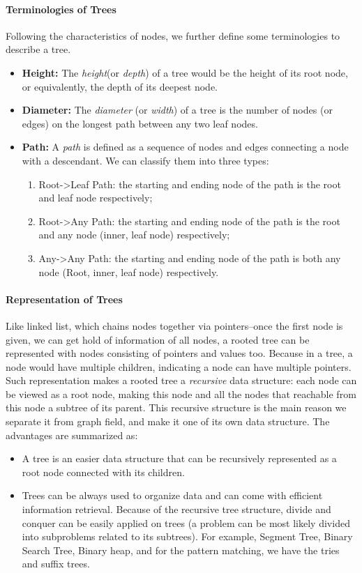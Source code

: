 \documentclass[../main.tex]{subfiles}
\begin{document}
\paragraph{Terminologies of Trees} Following the characteristics of nodes, we further define some terminologies to describe a tree. 
\begin{itemize}
    \item \textbf{Height:} The \textit{height}(or \textit{depth}) of a tree would be the height of its root node, or equivalently, the depth of its deepest node. 
    \item \textbf{Diameter:} The \textit{diameter} (or \textit{width}) of a tree is the number of nodes (or edges) on the longest path between any two leaf nodes. 
    \item \textbf{Path:} A \textit{path} is defined as a sequence of nodes and edges connecting a node with a descendant.  We can classify them into three types: 
\begin{enumerate}
    \item Root->Leaf Path: the starting and ending node of the path is the root and leaf node respectively;
    \item Root->Any Path: the starting and ending node of the path is the root and any node (inner, leaf node) respectively;
    \item Any->Any Path: the starting and ending node of the path is both any node (Root, inner, leaf node) respectively. 
\end{enumerate}
\end{itemize}

\paragraph{Representation of Trees}   Like linked list, which chains nodes together via pointers--once the first node is given, we can get hold of information of all nodes, a rooted tree can be represented with nodes consisting of pointers and values too. Because in a tree, a node would have multiple children, indicating a node can have multiple pointers.  Such representation makes a rooted tree  a \textit{recursive} data structure: each node can be viewed as a root node, making this node and all the nodes that reachable from this node a subtree of its parent. This recursive structure is the main reason we separate it from graph field, and make it one of its own data structure. The advantages are summarized as:
\begin{itemize}
    \item A tree is an easier data structure that can be recursively represented as a root node connected with its children. 
    \item Trees can be always used to organize data and can come with efficient information retrieval. Because of the recursive tree structure, divide and conquer can be easily applied on trees (a problem can be most likely divided into subproblems related to its subtrees).  For example, Segment Tree, Binary Search Tree, Binary heap, and for the pattern matching, we have the tries and suffix trees. 
\end{itemize}
\end{document}
